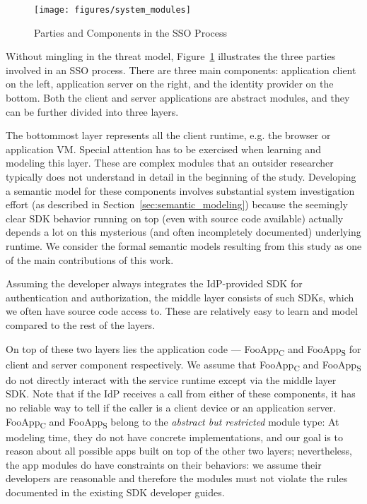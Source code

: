 \begin{figure}[hbt]
\centering
\texttt{[image: figures/system\_modules]}
\caption{Parties and Components in the SSO Process}
\label{fig:system_modules}
\end{figure}

Without mingling in the threat model, Figure~\ref{fig:system_modules} illustrates the three parties involved in an SSO process. There are three main components: application client on the left, application server on the right, and the identity provider on the bottom.  Both the client and server applications are abstract modules, and they can be further divided into three layers.  

The bottommost layer represents all the client runtime, e.g. the browser or application VM.  Special attention has to be exercised when learning and modeling this layer.  These are complex modules that an outsider researcher typically does not understand in detail in the beginning of the study.  Developing a semantic model for these components involves substantial system investigation effort (as described in Section~\ref{sec:semantic_modeling}) because the seemingly clear SDK behavior running on top (even with source code available) actually depends a lot on this mysterious (and often incompletely documented) underlying runtime.  We consider the formal semantic models resulting from this study as one of the main contributions of this work.

Assuming the developer always integrates the IdP-provided SDK for authentication and authorization, the middle layer consists of such SDKs, which we often have source code access to.  These are relatively easy to learn and model compared to the rest of the layers.

On top of these two layers lies the application code --- FooApp\textsubscript{C} and FooApp\textsubscript{S} for client and server component respectively.  We assume that FooApp\textsubscript{C} and FooApp\textsubscript{S} do not directly interact with the service runtime except via the middle layer SDK.  Note that if the IdP receives a call from either of these components, it has no reliable way to tell if the caller is a client device or an application server.  FooApp\textsubscript{C} and FooApp\textsubscript{S} belong to the \emph{abstract but restricted} module type:  At modeling time, they do not have concrete implementations, and our goal is to reason about all possible apps built on top of the other two layers; nevertheless, the app modules do have constraints on their behaviors: we assume their developers are reasonable and therefore the modules must not violate the rules documented in the existing SDK developer guides.

